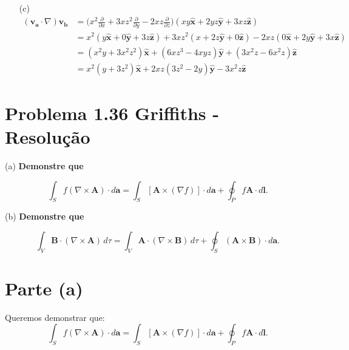 \documentclass[a4paper,12pt]{article}
\begin{document}
\begin{enumerate}
    \item[(c)]
    \begin{align}
        (\mathbf{v_a} \cdot \nabla) \mathbf{v_b} &= \Big(x^2 \frac{\partial}{\partial x} + 3x z^2 \frac{\partial}{\partial y} - 2xz \frac{\partial}{\partial z}\Big) (xy \hat{\mathbf{x}} + 2yz \hat{\mathbf{y}} + 3xz \hat{\mathbf{z}})\\
        &= x^2 (y \hat{\mathbf{x}} + 0 \hat{\mathbf{y}} + 3z \hat{\mathbf{z}}) + 3x z^2 (x + 2z \hat{\mathbf{y}} + 0 \hat{\mathbf{z}}) - 2xz (0 \hat{\mathbf{x}} + 2y \hat{\mathbf{y}} + 3x \hat{\mathbf{z}})\\
        &= (x^2 y + 3x^2 z^2) \hat{\mathbf{x}} + (6xz^3 - 4xyz) \hat{\mathbf{y}} + (3x^2 z - 6x^2 z) \hat{\mathbf{z}}\\
        &= \boxed{x^2 (y + 3z^2)\hat{\mathbf{x}} + 2xz (3z^2 - 2y) \hat{\mathbf{y}} - 3x^2 z \hat{\mathbf{z}}}
        \end{align}

\end{enumerate}
\section*{Problema 1.36 Griffiths - Resolu\c{c}\~ao}

(a) \textbf{Demonstre que}

\begin{equation}
\int_S f (\nabla \times \mathbf{A}) \cdot d\mathbf{a} =
\int_S [\mathbf{A} \times (\nabla f)] \cdot d\mathbf{a} + \oint_P f \mathbf{A} \cdot d\mathbf{l}.
\end{equation}

\hspace{-0.65cm}(b) \textbf{Demonstre que}

\begin{equation}
\int_V \mathbf{B} \cdot (\nabla \times \mathbf{A}) \, d\tau =
\int_V \mathbf{A} \cdot (\nabla \times \mathbf{B}) \, d\tau +
\oint_S (\mathbf{A} \times \mathbf{B}) \cdot d\mathbf{a}.
\end{equation}

\section*{Parte (a)}

Queremos demonstrar que:
\begin{equation}
\int_S f (\nabla \times \mathbf{A}) \cdot d\mathbf{a} =
\int_S [\mathbf{A} \times (\nabla f)] \cdot d\mathbf{a} + \oint_P f \mathbf{A} \cdot d\mathbf{l}.
\end{equation}
\end{document}
